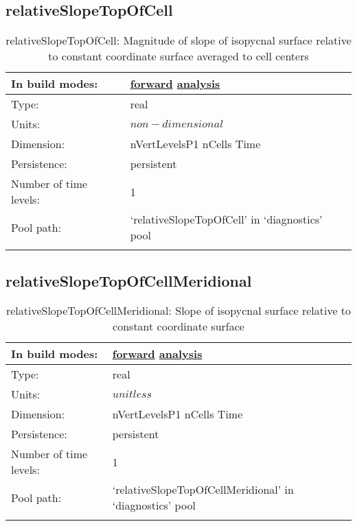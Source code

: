 \subsection[relativeSlopeTopOfCell]{relativeSlopeTopOfCell}
\label{subsec:var_sec_diagnostics_relativeSlopeTopOfCell}
\begin{center}
\begin{longtable}{| p{2.0in} | p{4.0in} |}
        \hline 
        In build modes: & \hyperref[subsec:forward_var_tab_diagnostics]{forward} \hyperref[subsec:analysis_var_tab_diagnostics]{analysis} \\
        \hline 
        Type: & real \\
        \hline 
        Units: & $non-dimensional$ \\
        \hline 
        Dimension: & nVertLevelsP1 nCells Time \\
        \hline 
        Persistence: & persistent \\
        \hline 
        Number of time levels: & 1 \\
        \hline 
            Pool path: & `relativeSlopeTopOfCell' in `diagnostics' pool \\
		 \hline 
    \caption{relativeSlopeTopOfCell: Magnitude of slope of isopycnal surface relative to constant coordinate surface averaged to cell centers}
\end{longtable}
\end{center}
\subsection[relativeSlopeTopOfCellMeridional]{relativeSlopeTopOfCellMeridional}
\label{subsec:var_sec_diagnostics_relativeSlopeTopOfCellMeridional}
\begin{center}
\begin{longtable}{| p{2.0in} | p{4.0in} |}
        \hline 
        In build modes: & \hyperref[subsec:forward_var_tab_diagnostics]{forward} \hyperref[subsec:analysis_var_tab_diagnostics]{analysis} \\
        \hline 
        Type: & real \\
        \hline 
        Units: & $unitless$ \\
        \hline 
        Dimension: & nVertLevelsP1 nCells Time \\
        \hline 
        Persistence: & persistent \\
        \hline 
        Number of time levels: & 1 \\
        \hline 
            Pool path: & `relativeSlopeTopOfCellMeridional' in `diagnostics' pool \\
		 \hline 
    \caption{relativeSlopeTopOfCellMeridional: Slope of isopycnal surface relative to constant coordinate surface}
\end{longtable}
\end{center}
